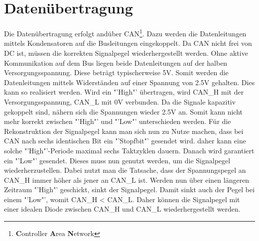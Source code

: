 \section{Datenübertragung}
Die Datenübertragung erfolgt andüber 
CAN\footnote{\textbf{C}ontroller \textbf{A}rea \textbf{N}etwork}. Dazu werden 
die Datenleitungen mittels Kondensatoren auf die Busleitungen eingekoppelt. Da 
CAN nicht frei von DC ist, müssen die korrekten Signalpegel wiederhergestellt 
werden. Ohne aktive Kommunikation auf dem Bus liegen beide Datenleitungen auf 
der halben Versorgungsspannung. Diese beträgt typischerweise 5\si{\volt}. 
Somit werden die Datenleitungen mittels Widerständen auf einer Spannung von 
2.5\si{\volt} gehalten. Dies kann so realisiert werden. Wird ein "'High"' 
übertragen, wird CAN\_H mit der Versorgungsspannung, CAN\_L mit 0\si{\volt} 
verbunden. Da die Signale kapazitiv gekoppelt sind, nähern sich die Spannungen 
wieder 2.5\si{\volt} an. Somit kann nicht mehr korrekt zwischen "'High"' und 
"'Low"' unterschieden werden. Für die Rekonstruktion der Signalpegel kann man 
sich nun zu Nutze machen, dass bei CAN nach sechs identischen Bit ein 
"'Stopfbit"' gesendet wird. daher kann eine solche "'High"'-Periode maximal 
sechs Taktzyklen dauern. Danach wird garantiert ein "'Low"' gesendet. Dieses 
muss nun genutzt werden, um die Signalpegel wiederherzustellen. Dabei nutzt 
man die Tatsache, dass der Spannungspegel an CAN\_H immer höher als jener an 
CAN\_L ist. Werden nun über einen längeren Zeitraum "'High"' geschickt, sinkt 
der Signalpegel. Damit sinkt auch der Pegel bei einem "'Low"', womit CAN\_H < 
CAN\_L. Daher können die Signalpegel mit einer idealen Diode zwischen CAN\_H 
und CAN\_L wiederhergestellt werden. 
